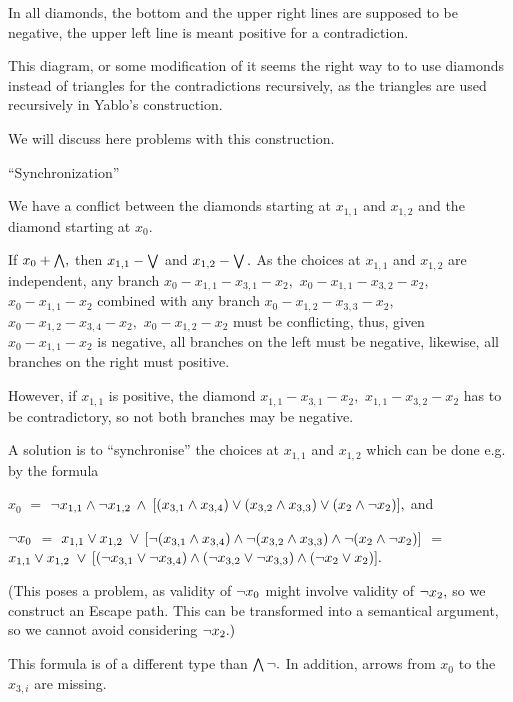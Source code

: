 In all diamonds, the bottom and the upper right lines are supposed to
be negative, the upper left line is meant positive for a contradiction.

This diagram, or some modification of it seems the right way to
to use diamonds instead of triangles for the contradictions recursively,
as the triangles are used recursively in Yablo's construction.

We will discuss here problems with this construction.

 \xEh

 \xDH ``Synchronization''

 \xEh
 \xDH We have a conflict between the diamonds starting at $x_{1,1}$ and
$x_{1,2}$ and
the diamond starting at $x_{0}.$

If $x_{0}+ \bigwedge,$ then $x_{1,1}- \bigvee $ and $x_{1,2}- \bigvee.$ As the
choices at $x_{1,1}$ and $x_{1,2}$ are
independent, any branch $x_{0}-x_{1,1}-x_{3,1}-x_{2},$
$x_{0}-x_{1,1}-x_{3,2}-x_{2},$ $x_{0}-x_{1,1}-x_{2}$
combined with any branch $x_{0}-x_{1,2}-x_{3,3}-x_{2},$
$x_{0}-x_{1,2}-x_{3,4}-x_{2},$ $x_{0}-x_{1,2}-x_{2}$
must be conflicting, thus, given $x_{0}-x_{1,1}-x_{2}$ is negative, all
branches
on the left must be negative, likewise, all branches on the right must
positive.

However, if $x_{1,1}$ is positive, the diamond $x_{1,1}-x_{3,1}-x_{2},$
$x_{1,1}-x_{3,2}-x_{2}$
has to be contradictory, so not both branches may be negative.

 \xDH A solution is to ``synchronise'' the choices at $x_{1,1}$ and
$x_{1,2}$ which
can be done e.g. by the formula

$x_{0}$ $=$ $ \neg x_{1,1} \wedge \neg x_{1,2}$ $ \wedge $ $[(x_{3,1} \wedge
x_{3,4}) \vee (x_{3,2} \wedge x_{3,3}) \vee (x_{2} \wedge \neg x_{2})],$ and

$ \neg x_{0}$ $=$ $x_{1,1} \vee x_{1,2}$ $ \vee $ $[ \neg (x_{3,1} \wedge
x_{3,4}) \wedge \neg (x_{3,2} \wedge x_{3,3}) \wedge \neg (x_{2} \wedge \neg
x_{2})]$ $=$
$x_{1,1} \vee x_{1,2}$ $ \vee $ $[(\neg x_{3,1} \vee \neg x_{3,4}) \wedge (
\neg x_{3,2} \vee \neg x_{3,3}) \wedge (\neg x_{2} \vee x_{2})].$

(This poses a problem, as validity of $ \neg x_{0}$ might involve validity
of $ \neg x_{2},$
so we construct an Escape path. This can be transformed into a semantical
argument, so we cannot avoid considering $ \neg x_{2}.)$

This formula is of a different type than $ \bigwedge \neg.$ In addition,
arrows from $x_{0}$
to the $x_{3,i}$ are missing.

